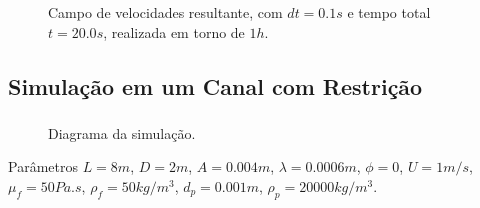 \documentclass{beamer}
\begin{document}
\begin{frame}
  \frametitle{\subsecname}
  \begin{figure}
     {\raggedleft \tiny Campo de velocidades resultante, com $dt=0.1s$ e tempo total $t=20.0s$, realizada em torno de $1h$.}
  \end{figure}
\end{frame}

\subsection*{Simulação em um Canal com Restrição}
\begin{frame}
  \frametitle{\subsecname}
  
  \begin{figure}
     {\raggedleft \tiny Diagrama da simulação.}
  \end{figure}
  \begin{block}{Parâmetros}
    $L=8m$, $D=2m$, $A=0.004m$, $\lambda=0.0006m$, $\phi=0$, $U=1m/s$, $\mu_f=50Pa.s$, $\rho_f=50kg/m^3$, $d_p=0.001m$, $\rho_p=20000kg/m^3$.
  \end{block}
\end{frame}
\end{document}
